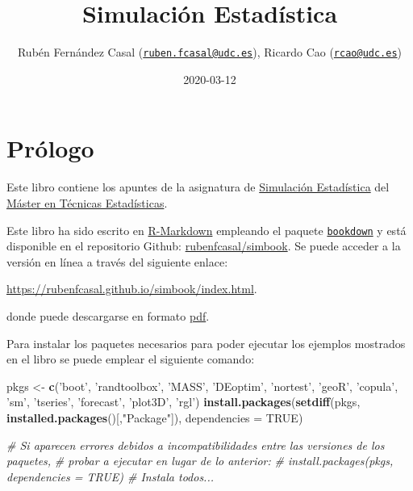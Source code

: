 \documentclass[
]{book}
\title{Simulación Estadística}
\author{Rubén Fernández Casal (\href{mailto:ruben.fcasal@udc.es}{\nolinkurl{ruben.fcasal@udc.es}}), Ricardo Cao (\href{mailto:rcao@udc.es}{\nolinkurl{rcao@udc.es}})}
\date{2020-03-12}
\newenvironment{Shaded}{\begin{snugshade}}{\end{snugshade}}
\newcommand{\CommentTok}[1]{\textcolor[rgb]{0.56,0.35,0.01}{\textit{#1}}}
\newcommand{\DataTypeTok}[1]{\textcolor[rgb]{0.13,0.29,0.53}{#1}}
\newcommand{\KeywordTok}[1]{\textcolor[rgb]{0.13,0.29,0.53}{\textbf{#1}}}
\newcommand{\NormalTok}[1]{#1}
\newcommand{\OtherTok}[1]{\textcolor[rgb]{0.56,0.35,0.01}{#1}}
\newcommand{\StringTok}[1]{\textcolor[rgb]{0.31,0.60,0.02}{#1}}
\theoremstyle{break}
\theoremstyle{definition}
\theoremstyle{definition}
\theoremstyle{definition}
\theoremstyle{remark}
\begin{document}
\maketitle

{
\setcounter{tocdepth}{1}
\tableofcontents
}
\hypertarget{pruxf3logo}{%
\chapter*{Prólogo}\label{pruxf3logo}}

Este libro contiene los apuntes de la asignatura de \href{http://eamo.usc.es/pub/mte/index.php/es/?option=com_content\&view=article\&id=2201\&idm=13\&a\%C3\%B1o=2019}{Simulación Estadística} del \href{http://eio.usc.es/pub/mte}{Máster en Técnicas Estadísticas}.

Este libro ha sido escrito en \href{http://rmarkdown.rstudio.com}{R-Markdown} empleando el paquete \href{https://bookdown.org/yihui/bookdown/}{\texttt{bookdown}} y está disponible en el repositorio Github: \href{https://github.com/rubenfcasal/simbook}{rubenfcasal/simbook}.
Se puede acceder a la versión en línea a través del siguiente enlace:

\url{https://rubenfcasal.github.io/simbook/index.html}.

donde puede descargarse en formato \href{https://rubenfcasal.github.io/simbook/Simulacion.pdf}{pdf}.

Para instalar los paquetes necesarios para poder ejecutar los ejemplos mostrados en el libro se puede emplear el siguiente comando:

\begin{Shaded}
\begin{Highlighting}[]
\NormalTok{pkgs <-}\StringTok{ }\KeywordTok{c}\NormalTok{(}\StringTok{'boot'}\NormalTok{, }\StringTok{'randtoolbox'}\NormalTok{, }\StringTok{'MASS'}\NormalTok{, }\StringTok{'DEoptim'}\NormalTok{, }\StringTok{'nortest'}\NormalTok{, }\StringTok{'geoR'}\NormalTok{, }\StringTok{'copula'}\NormalTok{, }\StringTok{'sm'}\NormalTok{,}
          \StringTok{'tseries'}\NormalTok{, }\StringTok{'forecast'}\NormalTok{, }\StringTok{'plot3D'}\NormalTok{, }\StringTok{'rgl'}\NormalTok{)}
\KeywordTok{install.packages}\NormalTok{(}\KeywordTok{setdiff}\NormalTok{(pkgs, }\KeywordTok{installed.packages}\NormalTok{()[,}\StringTok{"Package"}\NormalTok{]), }
                 \DataTypeTok{dependencies =} \OtherTok{TRUE}\NormalTok{)}

\CommentTok{# Si aparecen errores debidos a incompatibilidades entre las versiones de los paquetes, }
\CommentTok{# probar a ejecutar en lugar de lo anterior:}
\CommentTok{# install.packages(pkgs, dependencies = TRUE) # Instala todos...}
\end{Highlighting}
\end{Shaded}
\end{document}

